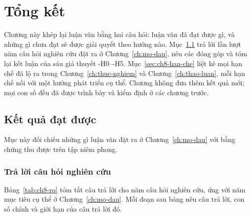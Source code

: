 
\section{Tổng kết}
\label{ch:tong-ket}

Chương này khép lại luận văn bằng hai câu hỏi: luận văn đã đạt được gì, và những gì chưa đạt sẽ được giải quyết theo hướng nào. Mục~\ref{sec:ch8-ket-qua} trả lời lần lượt năm câu hỏi nghiên cứu đặt ra ở Chương~\ref{ch:mo-dau}, nêu các đóng góp và tóm lại kết luận của sáu giả thuyết \hyp{H0}--\hyp{H5}. Mục~\ref{sec:ch8-han-che} liệt kê mọi hạn chế đã lộ ra trong Chương~\ref{ch:thuc-nghiem} và Chương~\ref{ch:thao-luan}, mỗi hạn chế nối với một hướng phát triển cụ thể. Chương không đưa thêm kết quả mới; mọi con số đều đã được trình bày và kiểm định ở các chương trước.

\subsection{Kết quả đạt được}
\label{sec:ch8-ket-qua}

Mục này đối chiếu những gì luận văn đặt ra ở Chương~\ref{ch:mo-dau} với bằng chứng thu được trên tập  niêm phong.

\subsubsection{Trả lời câu hỏi nghiên cứu}
\label{sec:ch8-rq}

Bảng~\ref{tab:ch8-rq} tóm tắt câu trả lời cho năm câu hỏi nghiên cứu, ứng với năm mục tiêu cụ thể ở Chương~\ref{ch:mo-dau}. Mỗi đoạn sau bảng nêu câu trả lời, con số chính và giới hạn của câu trả lời đó.

